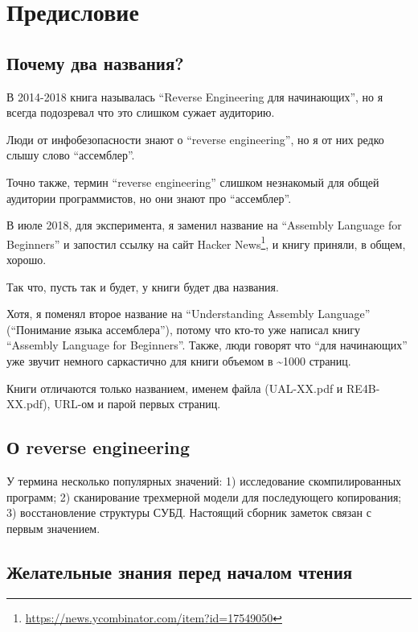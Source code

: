 \section*{Предисловие}

\subsection*{Почему два названия?}
\label{TwoTitles}

В 2014-2018 книга называлась ``Reverse Engineering для начинающих'', но я всегда подозревал что это слишком сужает аудиторию.

Люди от инфобезопасности знают о ``reverse engineering'', но я от них редко слышу слово ``ассемблер''.

Точно также, термин ``reverse engineering'' слишком незнакомый для общей аудитории программистов, но они знают про ``ассемблер''.

В июле 2018, для эксперимента, я заменил название на ``Assembly Language for Beginners''
и запостил ссылку на сайт Hacker News\footnote{\url{https://news.ycombinator.com/item?id=17549050}}, и книгу приняли, в общем, хорошо.

Так что, пусть так и будет, у книги будет два названия.

Хотя, я поменял второе название на ``Understanding Assembly Language'' (``Понимание языка ассемблера''), потому что кто-то уже написал книгу ``Assembly Language for Beginners''.
Также, люди говорят что ``для начинающих'' уже звучит немного саркастично для книги объемом в \textasciitilde{}1000 страниц.

Книги отличаются только названием, именем файла (UAL-XX.pdf и RE4B-XX.pdf), URL-ом и парой первых страниц.

\subsection*{О reverse engineering}

У термина  несколько популярных значений:
1) исследование скомпилированных
программ; 2) сканирование трехмерной модели для последующего копирования;
3) восстановление структуры СУБД. Настоящий сборник заметок
связан с первым значением.

\subsection*{Желательные знания перед началом чтения}

